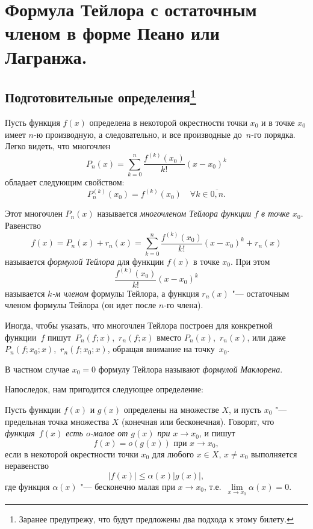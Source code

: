 \chapter{Формула Тейлора с остаточным членом в форме Пеано или Лагранжа.}

\section[Подготовительные определения]{Подготовительные определения\footnote{Заранее предупрежу, что будут предложены два подхода к этому билету.}}\label{ch5:sectearldefs}

Пусть функция $f(x)$ определена в некоторой окрестности точки $x_0$ и в точке $x_0$ имеет $n$-ю производную, а следовательно, и все производные до~$n$-го порядка. Легко видеть, что многочлен
$$
P_n(x) = \sum_{k = 0}^{n} \frac{f^{(k)}(x_0)}{k!} (x - x_0)^k
$$
обладает следующим свойством:
$$
P_n^{(k)}(x_0) = f^{(k)}(x_0) \quad \forall k \in \overline{0,n}.
$$

\begin{defn}
Этот многочлен $P_n(x)$ называется \textit{многочленом Тейлора функции $f$ в точке $x_0$}. Равенство $$
f(x) = P_n(x) + r_n(x) = \sum_{k = 0}^{n} \frac{f^{(k)}(x_0)}{k!} (x - x_0)^k + r_n(x)
$$ 
называется \textit{формулой Тейлора} для функции $f(x)$ в точке $x_0$. При этом $$\frac{f^{(k)}(x_0)}{k!} (x - x_0)^k$$ называется \textit{$k$-м членом} формулы Тейлора, а функция $r_n(x)$ "--- остаточным членом формулы Тейлора (он идет после $n$-го члена).
\end{defn}

Иногда, чтобы указать, что многочлен Тейлора построен для конкретной функции~$f$ пишут~$P_n(f;x)$,~$r_n(f;x)$ вместо $P_n(x)$,~$r_n(x)$, или даже $P_n(f;x_0;x)$,~$r_n(f;x_0;x)$, обращая внимание на точку~$x_0$.

В частном случае $x_0=0$ формулу Тейлора называют \textit{формулой Маклорена}.

Напоследок, нам пригодится следующее определение:
\begin{defn}
Пусть функции $f(x)$ и $g(x)$ определены на множестве $X$, и пусть $x_0$ "--- предельная точка множества $X$ (конечная или бесконечная). Говорят, что \textit{функция~$f(x)$ есть $o$-малое от $g(x)$ при $x\to x_0$}, и пишут
$$
f(x) = o(g(x)) \text{ при } x\to x_0,
$$ 
если в некоторой окрестности точки $x_0$ для любого $x \in X$, $x\ne x_0$ выполняется неравенство\footnotemark
$$
|f(x)| \le \alpha(x)|g(x)|,
$$
где функция $\alpha(x)$ "--- бесконечно малая при $x\to x_0$, т.е.~$\lim\limits_{x\to x_0}\alpha(x)= 0$.
\end{defn}

